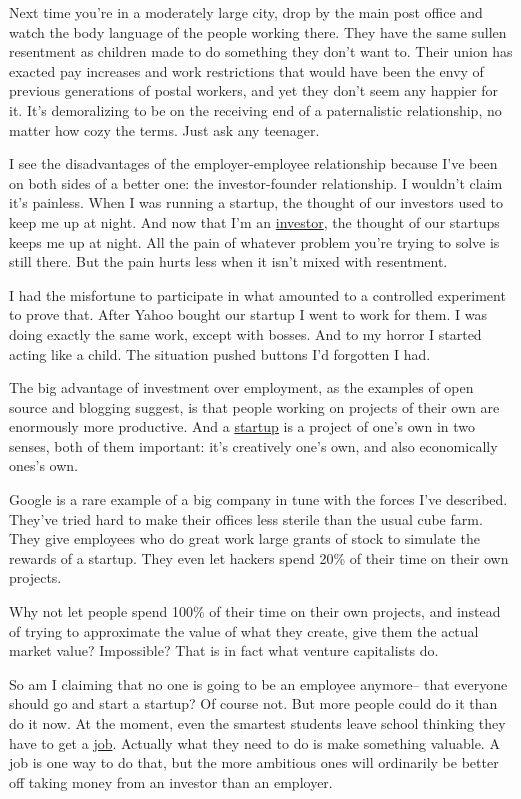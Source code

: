 \documentclass[12pt]{book}
\begin{document}
Next time you're in a moderately large city, drop by the main post
office and watch the body language of the people working there. They
have the same sullen resentment as children made to do something they
don't want to. Their union has exacted pay increases and work
restrictions that would have been the envy of previous generations of
postal workers, and yet they don't seem any happier for it. It's
demoralizing to be on the receiving end of a paternalistic relationship,
no matter how cozy the terms. Just ask any teenager.

I see the disadvantages of the employer-employee relationship because
I've been on both sides of a better one: the investor-founder
relationship. I wouldn't claim it's painless. When I was running a
startup, the thought of our investors used to keep me up at night. And
now that I'm an \href{http://ycombinator.com}{investor}, the thought of
our startups keeps me up at night. All the pain of whatever problem
you're trying to solve is still there. But the pain hurts less when it
isn't mixed with resentment.

I had the misfortune to participate in what amounted to a controlled
experiment to prove that. After Yahoo bought our startup I went to work
for them. I was doing exactly the same work, except with bosses. And to
my horror I started acting like a child. The situation pushed buttons
I'd forgotten I had.

The big advantage of investment over employment, as the examples of open
source and blogging suggest, is that people working on projects of their
own are enormously more productive. And a \href{start.html}{startup} is
a project of one's own in two senses, both of them important: it's
creatively one's own, and also economically ones's own.

Google is a rare example of a big company in tune with the forces I've
described. They've tried hard to make their offices less sterile than
the usual cube farm. They give employees who do great work large grants
of stock to simulate the rewards of a startup. They even let hackers
spend 20\% of their time on their own projects.

Why not let people spend 100\% of their time on their own projects, and
instead of trying to approximate the value of what they create, give
them the actual market value? Impossible? That is in fact what venture
capitalists do.

So am I claiming that no one is going to be an employee anymore-- that
everyone should go and start a startup? Of course not. But more people
could do it than do it now. At the moment, even the smartest students
leave school thinking they have to get a \href{hiring.html}{job}.
Actually what they need to do is make something valuable. A job is one
way to do that, but the more ambitious ones will ordinarily be better
off taking money from an investor than an employer.
\end{document}

